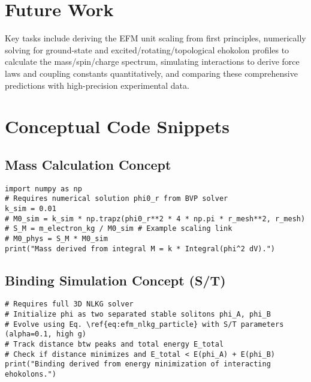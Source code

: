 \documentclass[11pt]{article}
\begin{document}
\section{Future Work}
Key tasks include deriving the EFM unit scaling from first principles, numerically solving for ground-state and excited/rotating/topological ehokolon profiles to calculate the mass/spin/charge spectrum, simulating interactions to derive force laws and coupling constants quantitatively, and comparing these comprehensive predictions with high-precision experimental data.

\appendix
\section{Conceptual Code Snippets}
\subsection{Mass Calculation Concept}
\begin{lstlisting}
import numpy as np
# Requires numerical solution phi0_r from BVP solver
k_sim = 0.01
# M0_sim = k_sim * np.trapz(phi0_r**2 * 4 * np.pi * r_mesh**2, r_mesh)
# S_M = m_electron_kg / M0_sim # Example scaling link
# M0_phys = S_M * M0_sim
print("Mass derived from integral M = k * Integral(phi^2 dV).")
\end{lstlisting}

\subsection{Binding Simulation Concept (S/T)}
\begin{lstlisting}
# Requires full 3D NLKG solver
# Initialize phi as two separated stable solitons phi_A, phi_B
# Evolve using Eq. \ref{eq:efm_nlkg_particle} with S/T parameters (alpha=0.1, high g)
# Track distance btw peaks and total energy E_total
# Check if distance minimizes and E_total < E(phi_A) + E(phi_B)
print("Binding derived from energy minimization of interacting ehokolons.")
\end{lstlisting}
\end{document}
